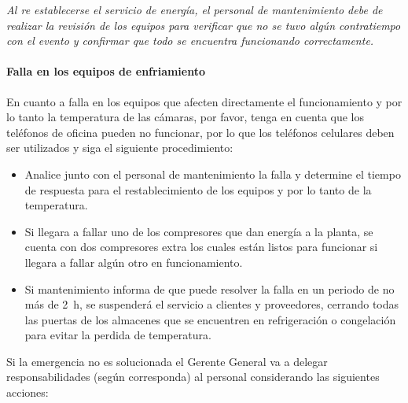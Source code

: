 \emph{Al re establecerse el servicio de energía, el personal de mantenimiento debe de realizar la revisión de los equipos para verificar que no se tuvo algún contratiempo con el evento y confirmar que todo se encuentra funcionando correctamente.}

\paragraph{Falla en los equipos de enfriamiento}
En cuanto a falla en los equipos que afecten directamente el funcionamiento y por lo tanto la temperatura de las cámaras, por favor, tenga en cuenta que los teléfonos de oficina pueden no funcionar, por lo que los teléfonos celulares deben ser utilizados y siga el siguiente procedimiento:

\begin{itemize}
	\item Analice junto con el personal de mantenimiento la falla y determine el tiempo de respuesta para el restablecimiento de los equipos y por lo tanto de la temperatura.
	\item Si llegara a fallar uno de los compresores que dan energía a la planta, se cuenta con dos compresores extra los cuales están listos para funcionar si llegara a fallar algún otro en funcionamiento.
	\item Si mantenimiento informa de que puede resolver la falla en un periodo de no más de \qty{2}{\hour}, se suspenderá el servicio a clientes y proveedores, cerrando todas las puertas de los almacenes que se encuentren en refrigeración o congelación para evitar la perdida de temperatura.
\end{itemize}

Si la emergencia no es solucionada el Gerente General va a delegar responsabilidades (según corresponda) al personal considerando las siguientes acciones:

